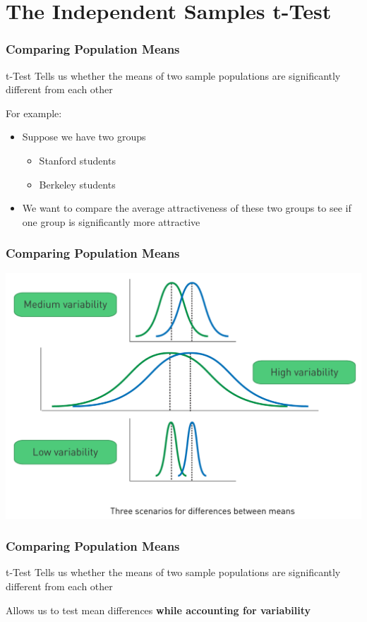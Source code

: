 \documentclass[12pt, block=fill]{beamer}
\begin{document}

\section{The Independent Samples t-Test}

\begin{frame}
  \frametitle{Comparing Population Means}
  \begin{exampleblock}{t-Test}
    Tells us whether the means of two sample populations are significantly different from each other 
  \end{exampleblock}

  For example:
  \begin{itemize}
      \item Suppose we have two groups
      \begin{itemize}
          \item Stanford students
          \item Berkeley students
      \end{itemize}
      \item We want to compare the average attractiveness of these two groups to see if one group is significantly more attractive
  \end{itemize}
\end{frame}

\begin{frame}
  \frametitle{Comparing Population Means}
    \begin{center}
        \includegraphics[width = 0.9\linewidth]{figures/t_test_scenarios.png}
    \end{center}
\end{frame}

\begin{frame}
  \frametitle{Comparing Population Means}
  \begin{exampleblock}{t-Test}
    Tells us whether the means of two sample populations are significantly different from each other 
    
    Allows us to test mean differences \textbf{while accounting for variability}
  \end{exampleblock}


\end{frame}
\end{document}

